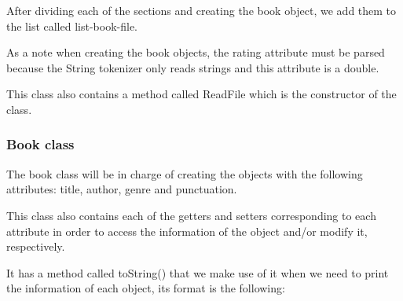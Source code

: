 \documentclass[a4paper]{article}
\theoremstyle{plain}
\theoremstyle{definition}
\begin{document}
        After dividing each of the sections and creating the book object, we add them to the list called list-book-file.
        
        As a note when creating the book objects, the rating attribute must be parsed because the String tokenizer only reads strings and this attribute is a double.
        
        This class also contains a method called ReadFile which is the constructor of the class.
    
	    \subsubsection{ Book class}
	    
	    The book class will be in charge of creating the objects with the following attributes: title, author, genre and punctuation.\newline

         This class also contains each of the getters and setters corresponding to each attribute in order to access the information of the object and/or modify it, respectively.\newline

         It has a method called toString() that we make use of it when we need to print the information of each object, its format is the following:\newline
    
\end{document}
